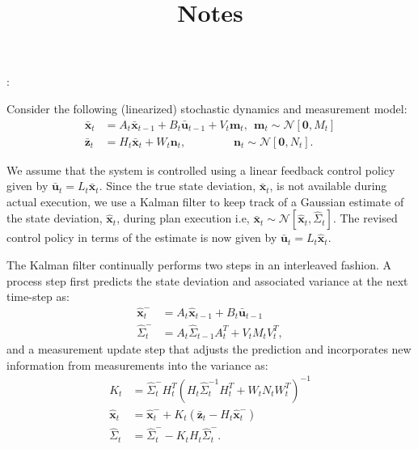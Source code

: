 \documentclass[letterpaper]{article}
\begin{document}
\title{\vspace{-50pt} Notes}

\author{}
\date{}

\maketitle

\vspace{-30pt}
:

Consider the following (linearized) stochastic dynamics and measurement model:
\vspace{-5pt}
\begin{align*}
\bar{\mathbf{x}}_t &= A_t\bar{\mathbf{x}}_{t-1} + B_t\bar{\mathbf{u}}_{t-1} + V_t\mathbf{m}_t, ~~ \mathbf{m}_t \sim \mathcal{N} [\mathbf{0}, M_t]\\
\bar{\mathbf{z}}_t &= H_t\bar{\mathbf{x}}_{t} + W_t\mathbf{n}_t, ~~~~~~~~~~~~~~~~~~~ \mathbf{n}_t \sim \mathcal{N} [\mathbf{0}, N_t].
\end{align*}

We assume that the system is controlled using a linear feedback control policy given by $\bar{\mathbf{u}}_t = L_t\bar{\mathbf{x}}_{t}$. Since the true state deviation, $\bar{\mathbf{x}}_t$, is not available during actual execution, we use a Kalman filter to keep track of a Gaussian estimate of the state deviation, $\hat{\mathbf{x}}_{t}$, during plan execution i.e, $\bar{\mathbf{x}}_t \sim \mathcal{N}[\hat{\mathbf{x}}_t, \hat{\Sigma}_t]$. The revised control policy in terms of the estimate is now given by $\bar{\mathbf{u}}_t = L_t\hat{\mathbf{x}}_{t}$.

The Kalman filter continually performs two steps in an interleaved fashion. A process step first predicts the state deviation and associated variance at the next time-step as:
\begin{align*}
\hat{\mathbf{x}}^{-}_{t} &= A_t \hat{\mathbf{x}}_{t-1} + B_t \bar{\mathbf{u}}_{t-1}\\
\hat{\Sigma}^{-}_{t} &= A_t \hat{\Sigma}_{t-1} A_t^T + V_t M_t V_t^T,
\end{align*}
and a measurement update step that adjusts the prediction and incorporates new information from measurements into the variance as:
\begin{align*}
K_t &= \hat{\Sigma}^{-}_{t} H_t^T (H_t\hat{\Sigma}^{-1}_t H_t^T + W_t N_t W_t^T)^{-1} \\
\hat{\mathbf{x}}_t &= \hat{\mathbf{x}}^{-}_{t} + K_t(\bar{\mathbf{z}}_t - H_t \hat{\mathbf{x}}^{-}_{t}) \\
\hat{\Sigma}_t &= \hat{\Sigma}^{-}_{t} - K_t H_t \hat{\Sigma}^{-}_{t}.
\end{align*}
\end{document}
